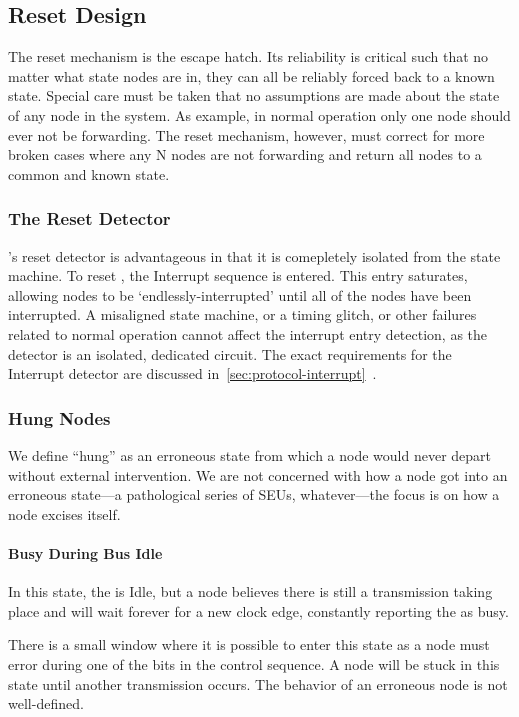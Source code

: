 \subsection{Reset Design}
\label{sec:design-reset}
The reset mechanism is the \bus escape hatch. Its reliability is critical such
that no matter what state \bus nodes are in, they can all be reliably forced
back to a known state. Special care must be taken that no assumptions are made
about the state of any node in the system. As example, in normal operation
only one node should ever not be forwarding. The reset mechanism, however,
must correct for more broken cases where any N nodes are not forwarding and
return all nodes to a common and known state.

\subsubsection{The Reset Detector}
\bus's reset detector is advantageous in that it is comepletely isolated from
the \bus state machine. To reset \bus, the Interrupt sequence is entered. This
entry saturates, allowing nodes to be `endlessly-interrupted' until all of the
nodes have been interrupted. A misaligned state machine, or a timing glitch,
or other failures related to normal operation cannot affect the interrupt
entry detection, as the detector is an isolated, dedicated circuit. The exact
requirements for the Interrupt detector are discussed
in~\ref{sec:protocol-interrupt}~.

\subsubsection{Hung Nodes}
\label{sec:reset-hung}
We define ``hung'' as an erroneous state from which a node would never depart
without external intervention. We are not concerned with how a node got into
an erroneous state---a pathological series of SEUs, whatever---the focus is on
how a node excises itself.

\paragraph{Busy During Bus Idle}
In this state, the \bus is Idle, but a node believes there is still a
transmission taking place and will wait forever for a new clock edge,
constantly reporting the \bus as busy.

There is a small window where it is possible to enter this state as a node
must error during one of the bits in the control sequence. A node will be
stuck in this state until another transmission occurs. The behavior of an
erroneous node is not well-defined.

